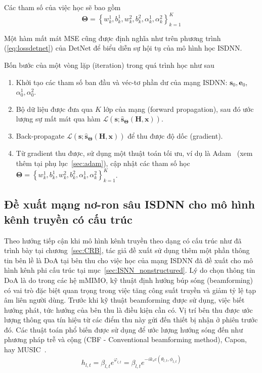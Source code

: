Các tham số của việc học sẽ bao gồm 
\begin{equation}
\boldsymbol{\Theta}=\left\{w^1_{k}, b^1_{k}, w^2_{k}, b^2_{k}, \alpha^1_k, \alpha^2_k \right\}_{k=1}^K
\end{equation}

Một hàm mất mát MSE cũng được định nghĩa như trên phương trình (\ref{eq:lossdetnet}) của DetNet để biểu diễn sự hội tụ của mô hình học ISDNN.

Bốn bước của một vòng lặp (iteration) trong quá trình học như sau
\begin{enumerate}
    \item Khởi tạo các tham số ban đầu và véc-tơ phần dư của mạng ISDNN: $\mathbf{s}_0, \mathbf{e}_0$, $\alpha^1_0, \alpha^2_0$.

    \item Bộ dữ liệu được đưa qua $K$ lớp của mạng (forward propagation), sau đó ước lượng sự mất mát qua hàm $\mathcal{L}(\mathbf{s}; \hat{\mathbf{s}}_{\boldsymbol{\Theta}}(\mathbf{H}, \mathbf{x}))$.

    \item Back-propagate $\mathcal{L}(\mathbf{s}; \hat{\mathbf{s}}_{\boldsymbol{\Theta}}(\mathbf{H}, \mathbf{x}))$ để thu được độ dốc (gradient).

    \item Từ gradient thu được, sử dụng một thuật toán tối ưu, ví dụ là Adam~\cite{Diederik2014} (xem thêm tại phụ lục~\ref{sec:adam}), cập nhật các tham số học $\boldsymbol{\Theta}=\left\{w^1_{k}, b^1_{k}, w^2_{k}, b^2_{k}, \alpha^1_k, \alpha^2_k \right\}_{k=1}^K$.
\end{enumerate}

\subsection{Đề xuất mạng nơ-ron sâu ISDNN cho mô hình kênh truyền có cấu trúc}

Theo hướng tiếp cận khi mô hình kênh truyền theo dạng có cấu trúc như đã trình bày tại chương~\ref{sec:CRB}, tác giả đề xuất sử dụng thêm một phần thông tin bên lề là DoA tại bên thu cho việc học của mạng ISDNN đã đề xuất cho mô hình kênh phi cấu trúc tại mục~\ref{sec:ISNN_nonstructured}. Lý do chọn thông tin DoA là do trong các hệ mMIMO, kỹ thuật định hướng búp sóng (beamforming)~\cite{shaik2021} có vai trò đặc biệt quan trọng trong việc tăng công suất truyền và giảm tỷ lệ tạp âm liên người dùng. Trước khi kỹ thuật beamforming được sử dụng, việc biết hướng phát, tức hướng của bên thu là điều kiện cần có. Vị trí bên thu được ước lượng thông qua tín hiệu từ các điểm thu này gửi đến thiết bị nhận ở phiên trước đó. Các thuật toán phổ biến được sử dụng để ước lượng hướng sóng đến như phương pháp trễ và cộng (CBF - Conventional beamforming method), Capon, hay MUSIC~\cite{Wang2016}. 
\begin{equation}
    h_{l, t} = \beta_{l, t} e^{\varphi_{l, t}} = \beta_{l, t} e^{-i k_s c (\theta_{l, t}, \phi_{l, t})}
\end{equation}

